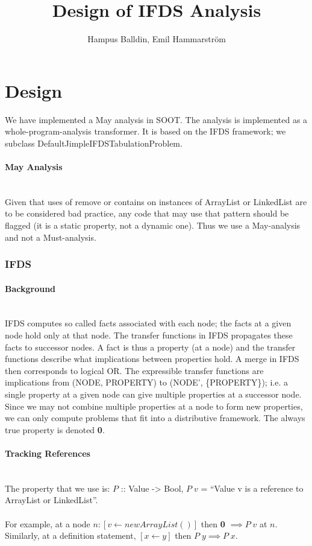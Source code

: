 \documentclass[a4paper]{article}
\title{Design of IFDS Analysis}
\author{Hampus Balldin, Emil Hammarström
}
\newcommand{\NL}[0]{ \hfill\\\noindent }
\begin{document}
\thispagestyle{empty}


\maketitle                    %
{}
\newpage
{}
\newpage
\section{Design}
We have implemented a May analysis in SOOT. The analysis is implemented as a whole-program-analysis transformer. It is based on the IFDS framework; we subclass DefaultJimpleIFDSTabulationProblem.

\paragraph{May Analysis}\NL
Given that uses of remove or contains on instances of ArrayList or LinkedList are to be considered bad practice, any code that may use that pattern should be flagged (it is a static property, not a dynamic one). Thus we use a May-analysis and not a Must-analysis.

\subsubsection{IFDS}
\paragraph{Background}\NL
IFDS computes so called facts associated with each node; the facts at a given node hold only at that node. The transfer functions in IFDS propagates these facts to successor nodes. A fact is thus a property (at a node) and the transfer functions describe what implications between properties hold. A merge in IFDS then corresponds to logical OR. The expressible transfer functions are implications from (NODE, PROPERTY) to (NODE', \{PROPERTY\}); i.e. a single property at a given node can give multiple properties at a successor node. Since we may not combine multiple properties at a node to form new properties, we can only compute problems that fit into a distributive framework. The always true property is denoted \textbf{0}.

\paragraph{Tracking References}\NL
The property that we use is: $P$ :: Value -> Bool, $P\;v$ = ``Value v is a reference to ArrayList or LinkedList''. 
\NL\NL
For example, at a node $n: [v \leftarrow new ArrayList()]$ then \textbf{0} $\implies P\;v$ at $n$. Similarly, at a definition statement, $[x \leftarrow y]$ then $P\;y \implies P\;x$. 
\end{document}
